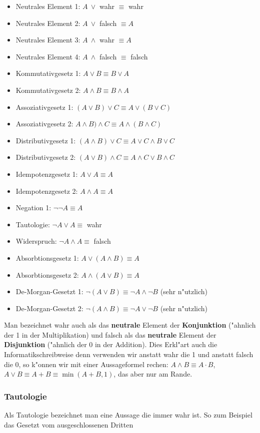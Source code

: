 \begin{itemize}
\item Neutrales Element 1: $A \ \lor $ wahr $\equiv$ wahr
\item Neutrales Element 2: $A \ \lor $ falsch $\equiv A$
\item Neutrales Element 3: $A \ \land $ wahr $\equiv A$
\item Neutrales Element 4: $A \ \land $ falsch $\equiv$ falsch
\item Kommutativgesetz 1: $A \lor B \equiv B \lor A$
\item Kommutativgesetz 2: $A \land B \equiv B \land A$
\item Assoziativgesetz 1: $(A \lor B) \lor C \equiv A \lor (B \lor C)$
\item Assoziativgesetz 2: $A \land B) \land C \equiv A \land (B \land C)$
\item Distributivgesetz 1: $(A \land B) \lor C \equiv A \lor C \land  B \lor C$
\item Distributivgesetz 2: $(A \lor B) \land C \equiv A \land C \lor B \land C$
\item Idempotenzgesetz 1: $A \lor A \equiv A$
\item Idempotenzgesetz 2: $A \land A \equiv A$
\item Negation 1: $\neg \neg A \equiv A$
\item Tautologie: $\neg A \lor A \equiv $ wahr
\item Widerspruch: $\neg A \land A \equiv$ falsch
\item Absorbtionsgesetz 1: $A \lor (A \land B) \equiv A$
\item Absorbtionsgesetz 2: $A \land (A \lor B) \equiv A$
\item De-Morgan-Gesetzt 1: $\neg (A \lor B) \equiv \neg A \land \neg B$ (sehr n"utzlich)
\item De-Morgan-Gesetzt 2: $\neg (A \land B) \equiv \neg A \lor \neg B$ (sehr n"utzlich)
\end{itemize}
Man bezeichnet wahr auch als das \textbf{neutrale} Element der \textbf{Konjunktion} ("ahnlich der 1 in der Multiplikation) und falsch als das \textbf{neutrale} Element der \textbf{Disjunktion} ("ahnlich der 0 in der Addition). Dies Erkl"art auch die Informatikschreibweise denn verwenden wir anstatt wahr die 1 und anstatt falsch die 0, so k"onnen wir mit einer Aussageformel rechen: $A \land B \equiv A \cdot B$, $A \lor B \equiv A + B \equiv \min(A + B, 1)$, das aber nur am Rande.

\subsubsection{Tautologie}
Als Tautologie bezeichnet man eine Aussage die immer wahr ist. So zum Beispiel das Gesetzt vom ausgeschlossenen Dritten

